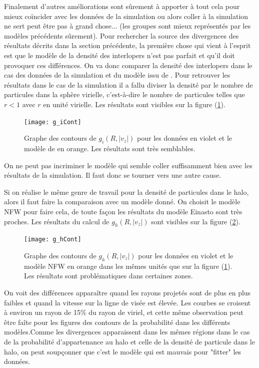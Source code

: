 Finalement d'autres améliorations sont sûrement à apporter à tout cela pour mieux coïncider avec les données de la simulation ou
alors coller à la simulation ne sert peut être pas à grand chose... (les groupes sont mieux représentés par les modèles précédents
sûrement).
Pour rechercher la source des divergences des résultats décrits dans la section précédente, la première chose qui vient à l'esprit
est que le modèle de la densité des interlopers n'est pas parfait et qu'il doit provoquer ces différences. On va donc comparer la
densité des interlopers dans le cas des données de la simulation et du modèle issu de \citet{MBM10}. Pour retrouver les résultats
dans le cas de la simulation il a fallu diviser la densité par le nombre de particules dans la sphère virielle, c'est-à-dire le
nombre de particules telles que $r<1$ avec $r$ en unité virielle. Les résultats sont visibles sur la figure (\ref{fig:gicont}).
\begin{figure}[htb]
	\centering
	\texttt{[image: g\_iCont]}
	\caption{\footnotesize{}Graphe des contours de $g_i{(R,|v_z|)}$ pour les données en violet et le modèle de \citet{MBM10} en
	orange. Les résultats sont très semblables.}
	\label{fig:gicont}
\end{figure}
On ne peut pas incriminer le modèle qui semble coller suffisamment bien avec les résultats de la simulation. Il faut donc se
tourner vers une autre cause.

Si on réalise le même genre de travail pour la densité de particules dans le halo, alors il faut faire la comparaison avec un modèle
donné. On choisit le modèle NFW pour faire cela, de toute façon les résultats du modèle Einasto sont très proches. Les résultats du
calcul de $g_h{(R,|v_z|)}$ sont visibles sur la figure (\ref{fig:ghcont}).
\begin{figure}[htb]
	\centering
	\texttt{[image: g\_hCont]}
	\caption{\footnotesize{}Graphe des contours de $g_h{(R,|v_z|)}$ pour les données en violet et le modèle NFW en orange dans
	les mêmes unités que sur la figure (\ref{fig:gicont}). Les résultats sont problématiques dans certaines zones.}
	\label{fig:ghcont}
\end{figure}
On voit des différences apparaître quand les rayons projetés sont de plus en plus faibles et quand la vitesse sur la ligne de visée
est élevée. Les courbes se croisent à environ un rayon de \num{15}\% du rayon de viriel, et cette même observation peut être faîte
pour les figures des contours de la probabilité dans les différents modèles.Comme les divergences apparaissent dans les mêmes
régions dans le cas de la probabilité d'appartenance au halo et celle de la densité de particule dans le halo, on peut soupçonner
que c'est le modèle qui est mauvais pour "fitter" les données.

